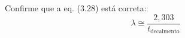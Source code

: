 Confirme que a eq. (3.28) está correta:
\[
  \lambda \cong \frac{2{,}303}{t_{\text{decaimento}}}
\]


